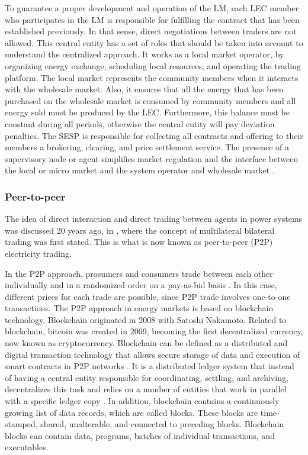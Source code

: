 To guarantee a proper development and operation of the LM, each LEC member who participates in the LM is responsible for fulfilling the contract that has been established previously. In that sense, direct negotiations between traders are not allowed. This central entity has a set of roles that should be taken into account to understand the centralized approach. It works as a local market operator, by organizing energy exchange, scheduling local resources, and operating the trading platform. The local market represents the community members when it interacts with the wholesale market. Also, it ensures that all the energy that has been purchased on the wholesale market is consumed by community members and all energy sold must be produced by the LEC. Furthermore, this balance must be constant during all periods, otherwise the central entity will pay deviation penalties. The SESP is responsible for collecting all contracts and offering to their members a brokering, clearing, and price settlement service. The presence of a supervisory node or agent simplifies market regulation and the interface between the local or micro market and the system operator and wholesale market \cite{moret2018energy}.

\subsubsection{Peer-to-peer}
The idea of direct interaction and direct trading between agents in power systems was discussed 20 years ago, in \cite{wu1999coordinated}, where the concept of multilateral bilateral trading was first stated. This is what is now known as peer-to-peer (P2P) electricity trading.

In the P2P approach, prosumers and consumers trade between each other individually and in a randomized order on a pay-as-bid basis \cite{mengelkamp2018blockchain}. In this case, different prices for each trade are possible, since P2P trade involves one-to-one transactions. The P2P approach in energy markets is based on blockchain technology. Blockchain originated in 2008 with Satoshi Nakamoto. Related to blockchain, bitcoin was created in 2009, becoming the first decentralized currency, now known as cryptocurrency. Blockchain can be defined as a distributed and digital transaction technology that allows secure storage of data and execution of smart contracts in P2P networks \cite{swan2015blockchain}. It is a distributed ledger system that instead of having a central entity responsible for coordinating, settling, and archiving, decentralizes this task and relies on a number of entities that work in parallel with a specific ledger copy \cite{Pinson2017}.
In addition, blockchain contains a continuously growing list of data records, which are called blocks. These blocks are time-stamped, shared, unalterable, and connected to preceding blocks. Blockchain blocks can contain data, programs, batches of individual transactions, and executables.

